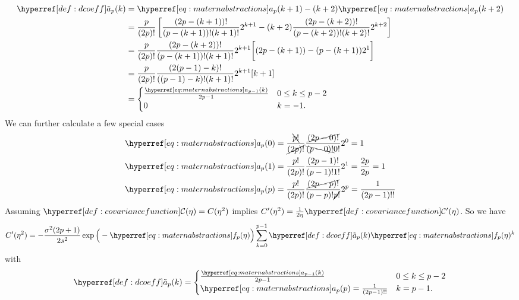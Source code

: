 \begin{align}
	\nonumber
	\dcoeff(k)
	&= \mcoeff(k+1) - (k+2)\mcoeff(k+2)\\
	\nonumber
	&= \frac{p}{(2p)!}\left[
		\frac{(2p-(k+1))!}{(p-(k+1))!(k+1)!}2^{k+1}
		- (k+2)\frac{(2p-(k+2))!}{(p-(k+2))!(k+2)!}2^{k+2}
	\right]\\
	\nonumber
	&= \frac{p}{(2p)!}\frac{(2p - (k+2))!}{(p-(k+1))!(k+1)!}2^{k+1}
	\bigg[(2p-(k+1))- (p-(k+1))2^1\bigg]\\
	\nonumber
	&= \frac{p}{(2p)!}\frac{(2(p-1) -k)!}{((p-1)-k)!(k+1)!}2^{k+1}[k+1]\\
	\label{eq: dcoeff(k)}
	&= \begin{cases}
		\frac{\mcoeff[p-1](k)}{2p-1} & 0 \le k \le p-2\\
		0 & k=-1.
	\end{cases}
\end{align}
We can further calculate a few special cases
\begin{align}
	\label{eq: mcoeff 0}
	\mcoeff(0)
	&= \frac{\bcancel{p!}}{\cancel{(2p)!}}\frac{\cancel{(2p-0)!}}{\bcancel{(p-0)!}0!}2^0
	= 1 \\
	\label{eq: mcoeff 1}
	\mcoeff(1)
	&= \frac{p!}{(2p)!}\frac{(2p-1)!}{(p-1)!1!}2^1 = \frac{2p}{2p} = 1 \\
	\mcoeff(p)
	\label{eq: mcoeff p}
	&= \frac{p!}{(2p)!}\frac{\cancel{(2p-p)!}}{(p-p)!\cancel{p!}}2^p
	= \frac{1}{(2p-1)!!}
\end{align}
%
Assuming \(\C(\lr) = \sqC(\lr^2)\) implies \(\sqC'(\lr^2) = \frac1{2\lr}\C'(\lr)\).
So we have
\begin{equation*}
	\sqC'(\lr^2)
	=-\frac{\sigma^2(2p+1)}{2s^2}
	\exp\Big(-\mf(\lr)\Big)\sum_{k=0}^{p-1} \dcoeff(k)\mf(\lr)^k
\end{equation*}
with
\begin{equation*}
	\dcoeff(k) = \begin{cases}
		\frac{\mcoeff[p-1](k)}{2p-1} & 0 \le k \le p-2\\
		\mcoeff(p) = \frac{1}{(2p-1)!!} & k=p-1.
	\end{cases}
\end{equation*}

